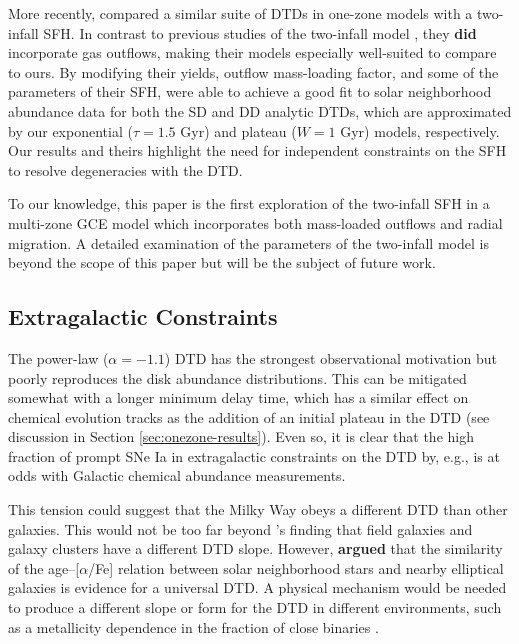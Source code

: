 \documentclass[twocolumn,twocolappendix,linenumbers]{aastex631}
\newcommand{\aFe}{[$\alpha$/Fe]\xspace}
\begin{document}
More recently, \citet{Palicio2023-AnalyticDTD} compared a similar suite of DTDs in one-zone models with a two-infall SFH. In contrast to previous studies of the two-infall model \citep[e.g.,][]{Chiappini1997-TwoInfall,Matteucci2009-DTDModels,Spitoni2021-TwoInfall}, they {\bf did} incorporate gas outflows, making their models especially well-suited to compare to ours. By modifying their yields, outflow mass-loading factor, and some of the parameters of their SFH, \citet{Palicio2023-AnalyticDTD} were able to achieve a good fit to solar neighborhood abundance data for both the SD and DD analytic DTDs, which are approximated by our exponential ($\tau=1.5$ Gyr) and plateau ($W=1$ Gyr) models, respectively. Our results and theirs highlight the need for independent constraints on the SFH to resolve degeneracies with the DTD.

To our knowledge, this paper is the first exploration of the two-infall SFH in a multi-zone GCE model which incorporates both mass-loaded outflows and radial migration. A detailed examination of the parameters of the two-infall model is beyond the scope of this paper but will be the subject of future work.

\subsection{Extragalactic Constraints}

The power-law ($\alpha=-1.1$) DTD has the strongest observational motivation but poorly reproduces the disk abundance distributions. This can be mitigated somewhat with a longer minimum delay time, which has a similar effect on chemical evolution tracks as the addition of an initial plateau in the DTD (see discussion in Section \ref{sec:onezone-results}). Even so, it is clear that the high fraction of prompt SNe Ia in extragalactic constraints on the DTD by, e.g., \citet{Maoz2017-CosmicDTD} is at odds with Galactic chemical abundance measurements. 

This tension could suggest that the Milky Way obeys a different DTD than other galaxies. This would not be too far beyond \citeauthor{Maoz2017-CosmicDTD}'s \citeyearpar{Maoz2017-CosmicDTD} finding that field galaxies and galaxy clusters have a different DTD slope. However, \citet{Walcher2016-SelfSimilarity} {\bf argued} that the similarity of the age--\aFe relation between solar neighborhood stars and nearby elliptical galaxies is evidence for a universal DTD. A physical mechanism would be needed to produce a different slope or form for the DTD in different environments, such as a metallicity dependence in the fraction of close binaries \citep[e.g.,][]{Moe2019-CloseBinaryFraction}.
\end{document}
